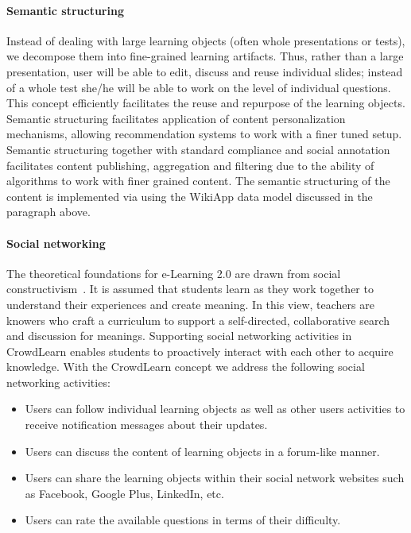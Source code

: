 \documentclass[PhD, Submit, ngerman,UKenglish,table]{scrbook}
\begin{document}
\paragraph{Semantic structuring}

Instead of dealing with large learning objects (often whole presentations or tests), we decompose them into fine-grained learning artifacts.
Thus, rather than a large presentation, user will be able to edit, discuss and reuse individual slides; instead of a whole test she/he will be able to work on the level of individual questions.
This concept efficiently facilitates the reuse and repurpose of the learning objects.
Semantic structuring facilitates application of content personalization mechanisms, allowing recommendation systems to work with a finer tuned setup.
Semantic structuring together with standard compliance and social annotation facilitates content publishing, aggregation and filtering due to the ability of algorithms to work with finer grained content.
The semantic structuring of the content is implemented via using the WikiApp data model discussed in the paragraph above.

\paragraph{Social networking}

The theoretical foundations for e-Learning 2.0 are drawn from social constructivism~\cite{Wang2012}.
It is assumed that students learn as they work together to understand their experiences and create meaning.
In this view, teachers are knowers who craft a curriculum to support a self-directed, collaborative search and discussion for meanings.
Supporting social networking activities in CrowdLearn enables students to proactively interact with each other to acquire knowledge.
With the CrowdLearn concept we address the following social networking activities: 

\begin{itemize}
\item Users can follow individual learning objects as well as other users activities to receive notification messages about their updates. 
\item Users can discuss the content of learning objects in a forum-like manner. 
\item Users can share the learning objects within their social network websites such as Facebook, Google Plus, LinkedIn, etc. 
\item Users can rate the available questions in terms of their difficulty.
\end{itemize}
\end{document}

